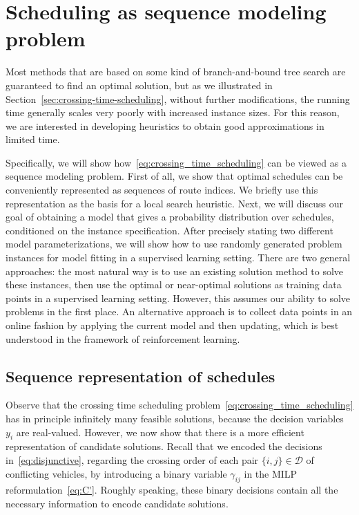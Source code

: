 \documentclass[a4paper]{report}
\theoremstyle{definition}
\theoremstyle{plain}
\begin{document}
\chapter{Scheduling as sequence modeling problem}\label{chap:single-learning}

Most methods that are based on some kind of branch-and-bound tree search are
guaranteed to find an optimal solution, but as we illustrated in Section~\ref{sec:crossing-time-scheduling},
without further modifications, the running time generally scales very poorly
with increased instance sizes. For this reason, we are interested in developing
heuristics to obtain good approximations in limited time.

Specifically, we will show how~\eqref{eq:crossing_time_scheduling} can be viewed
as a sequence modeling problem.
%
First of all, we show that optimal schedules can be conveniently represented as sequences of route indices.
%
We briefly use this representation as the basis for a local search heuristic.
%
Next, we will discuss our goal of obtaining a model that gives a probability distribution over schedules, conditioned on the instance specification.
%
After precisely stating two different model parameterizations, we will show how
to use randomly generated problem instances for model fitting in a supervised
learning setting.
%
There are two general approaches: the most natural way is to use an existing
solution method to solve these instances, then use the optimal or near-optimal
solutions as training data points in a supervised learning setting.
%
However, this assumes our ability to solve problems in the first place.
%
An alternative approach is to collect data points in an online fashion by
applying the current model and then updating, which is best understood in the
framework of reinforcement learning.

\section{Sequence representation of schedules}

Observe that the crossing time scheduling
problem~\eqref{eq:crossing_time_scheduling} has in principle infinitely many
feasible solutions, because the decision variables $y_i$ are real-valued.
However, we now show that there is a more efficient representation of candidate
solutions.
%
Recall that we encoded the decisions in~\eqref{eq:disjunctive}, regarding the
crossing order of each pair $\{i,j\} \in \mathcal{D}$ of conflicting vehicles,
by introducing a binary variable $\gamma_{ij}$ in the MILP
reformulation~\eqref{eq:C'}.
%
Roughly speaking, these binary decisions contain all the necessary information
to encode candidate solutions.
\end{document}
